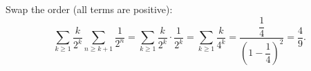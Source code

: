 Swap the order (all terms are positive):
\[\sum_{k\ge1}\dfrac k{2^k}\sum_{n\ge k+1}\dfrac1{2^n}=\sum_{k\ge1}\dfrac k{2^k}\cdot\dfrac1{2^k}=\sum_{k\ge1}\dfrac k{4^k}=\dfrac{\dfrac14}{\left(1-\dfrac14\right)^2}=\boxed{\dfrac49}.\]
